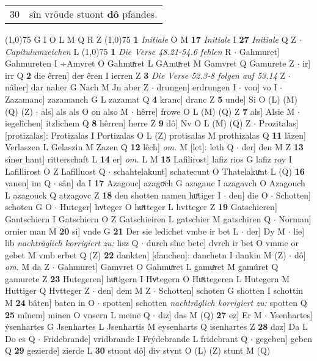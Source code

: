 \documentclass[8pt,a4paper,notitlepage]{article}
\begin{document}
\begin{table}[ht]
\begin{minipage}[t]{0.5\linewidth}
\begin{tabular}{rl}
30 & sîn vröude stuont \textbf{dô} pfandes.\\ 
\end{tabular}
\scriptsize
\line(1,0){75} \newline
G I O L M Q R Z \newline
\line(1,0){75} \newline
\textbf{1} \textit{Initiale} O M  \textbf{17} \textit{Initiale} I  \textbf{27} \textit{Initiale} Q Z   $\cdot$ \textit{Capitulumzeichen} L  \newline
\line(1,0){75} \newline
\textbf{1} \textit{Die Verse 48.21-54.6 fehlen} R   $\cdot$ Gahmuret] Gahmureten I ÷Amvret O Gahmuͯret L GAmuͯret M Gamvret Q Gamurete Z  $\cdot$ ir] irr Q \textbf{2} die êrren] der êren I ierren Z \textbf{3} \textit{Die Verse 52.3-8 folgen auf 53.14} Z   $\cdot$ nâher] dar naher G Nach M Jn aber Z  $\cdot$ drungen] erdrungen I  $\cdot$ von] vo I  $\cdot$ Zazamanc] zazamanch G L zazamat Q \textbf{4} kranc] dranc Z \textbf{5} unde] Si O (L) (M) (Q) (Z)  $\cdot$ als] als als O on also M  $\cdot$ hêrre] frowe O L (M) (Q) Z \textbf{7} als] Alsie M  $\cdot$ iegelîchen] itzlichem Q \textbf{8} hêrren] herre Z \textbf{9} dô] Nv O L (M) (Q) Z  $\cdot$ Prozitalas] [protizalas]: Protizalas I Portizalas O L (Z) protisalas M prothizalas Q \textbf{11} lâzen] Verlaszen L Gelaszin M Zazen Q \textbf{12} lêch] \textit{om.} M [let]: leth Q  $\cdot$ der] den M Z \textbf{13} sîner hant] ritterschaft L \textbf{14} er] \textit{om.} L M \textbf{15} Lafilirost] lafiz rios G lafiz roy I Lafillirost O Z Lafilluost Q  $\cdot$ schahtelakunt] schatecunt O Thatelakuͯnt L (Q) \textbf{16} vanen] im Q  $\cdot$ sân] da I \textbf{17} Azagouc] azagoͮch G azagauc I azagavch O Azagouch L azagouck Q atzagovc Z \textbf{18} den shotten namen huͤtiger I  $\cdot$ den] die O  $\cdot$ Schotten] schoten G O  $\cdot$ Huteger] hvͦteger O huͯtteger L hvtteger Z \textbf{19} Gatschieren] Gantschiern I Gatschiern O Z Gatschieiren L gatschier M gatschiren Q  $\cdot$ Norman] ornier man M \textbf{20} si] vnde G \textbf{21} Der sie ledichet vmbe ir bet L  $\cdot$ der] Dy M  $\cdot$ lie] lib \textit{nachträglich korrigiert zu:} lisz Q  $\cdot$ durch sîne bete] dvrch ir bet O vmme or gebet M vmb erbet Q (Z) \textbf{22} dankten] [danchen]: danchetn I dankin M (Z)  $\cdot$ dô] \textit{om.} M da Z  $\cdot$ Gahmuret] Gamvret O Gahmuͯret L gamuͯret M gamúret Q gamurete Z \textbf{23} Hutegeren] huͤtigern I Hvͦtegern O Huͯttegeren L Hutegern M Huttiger Q Hvtteger Z  $\cdot$ den] dem M Z  $\cdot$ Schotten] schoten G shotten I schottin M \textbf{24} bâten] baten in O  $\cdot$ spotten] schotten \textit{nachträglich korrigiert zu:} spotten Q \textbf{25} mînem] minen O vnsern L meinē Q  $\cdot$ diz] das M (Q) \textbf{27} ez] Er M  $\cdot$ Ysenhartes] ẏsenhartes G Jsenhartes L Jsenhartis M eysenharts Q isenhartes Z \textbf{28} daz] Da L Do es Q  $\cdot$ Fridebrande] vridbrande I Frýdebrande L fridebrant Q  $\cdot$ gegeben] geben Q \textbf{29} gezierde] zierde L \textbf{30} stuont dô] div stvnt O (L) (Z) stunt M (Q) \newline

\end{minipage}
\end{table}
\end{document}
